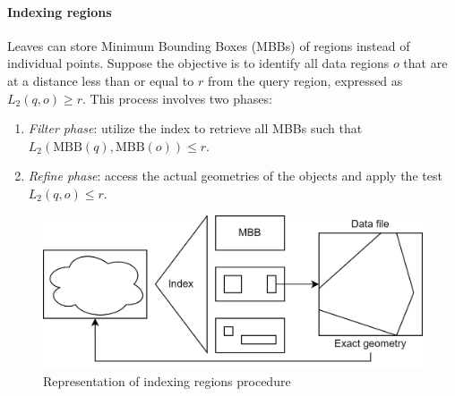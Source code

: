 \paragraph*{Indexing regions}
Leaves can store Minimum Bounding Boxes (MBBs) of regions instead of individual points. 
Suppose the objective is to identify all data regions $o$ that are at a distance less than or equal to $r$ from the query region, expressed as $L_2(q,o) \geq r$. 
This process involves two phases:
\begin{enumerate}
    \item \textit{Filter phase}: utilize the index to retrieve all MBBs such that $L_2\left(\text{MBB}(q),\text{MBB}(o)\right) \leq r$.
    \item \textit{Refine phase}: access the actual geometries of the objects and apply the test $L_2(q,o) \leq r$.
\end{enumerate}
\begin{figure}[H]
    \centering
    \includegraphics[width=0.75\linewidth]{images/i.png}
    \caption{Representation of indexing regions procedure}
\end{figure}